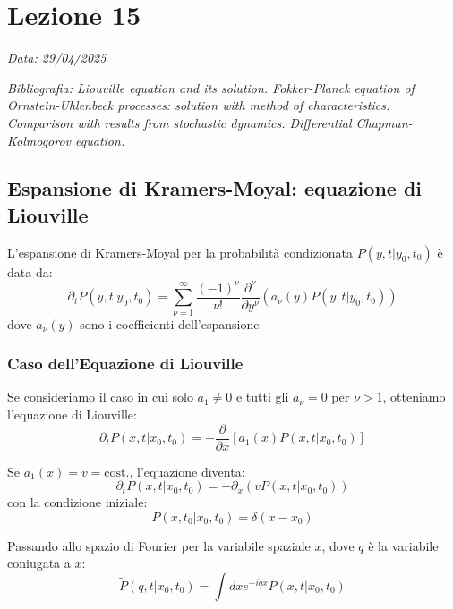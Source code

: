 \chapter{Lezione 15}
\label{chap:lezione_15} %

\begin{flushright}
\textit{Data: 29/04/2025}
\end{flushright}
\textit{Bibliografia: 
Liouville equation and its solution. Fokker-Planck equation of Ornstein-Uhlenbeck processes: solution with method of characteristics. Comparison with results from stochastic dynamics. Differential Chapman-Kolmogorov equation.}

\section{Espansione di Kramers-Moyal: equazione di Liouville}

L'espansione di Kramers-Moyal per la probabilità condizionata $P(y,t|y_{0},t_{0})$ è data da:
\begin{equation}
\partial_{t}P(y,t|y_{0},t_{0})=\sum_{\nu=1}^{\infty}\frac{(-1)^{\nu}}{\nu!}\frac{\partial^{\nu}}{\partial y^{\nu}}(a_{\nu}(y)P(y,t|y_{0},t_{0}))
\end{equation}
dove $a_{\nu}(y)$ sono i coefficienti dell'espansione.

\subsection{Caso dell'Equazione di Liouville}
Se consideriamo il caso in cui solo $a_1 \neq 0$ e tutti gli $a_{\nu}=0$ per $\nu > 1$, otteniamo l'equazione di Liouville:
\begin{equation}
\partial_{t}P(x,t|x_{0},t_{0})=-\frac{\partial}{\partial x}[a_1(x)P(x,t|x_{0},t_{0})]
\end{equation}

Se $a_1(x) = v = \text{cost.}$, l'equazione diventa:
\begin{equation}
\partial_{t}P(x,t|x_{0},t_{0})=-\partial_{x}(v P(x,t|x_{0},t_{0}))
\end{equation}
con la condizione iniziale:
\begin{equation}
P(x,t_{0}|x_{0},t_{0})=\delta(x-x_{0})
\end{equation}

Passando allo spazio di Fourier per la variabile spaziale $x$, dove $q$ è la variabile coniugata a $x$:
\begin{equation}
\tilde{P}(q,t|x_0, t_0) = \int dx e^{-iqx} P(x,t|x_0, t_0)
\end{equation}

